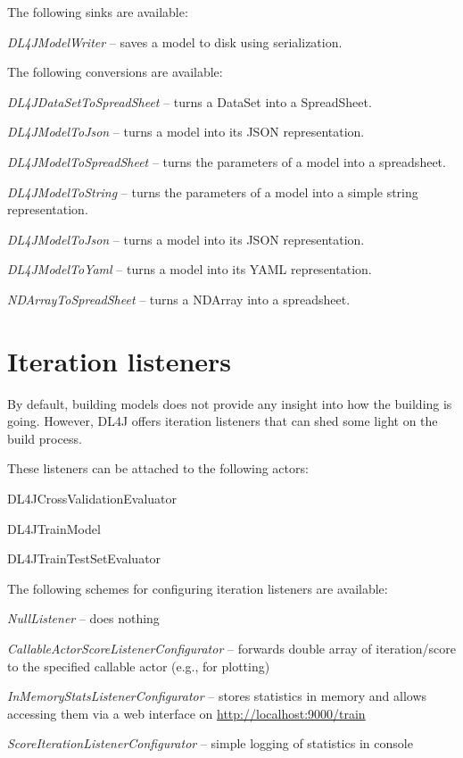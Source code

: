\documentclass[a4paper]{book}
\begin{document}
The following sinks are available:
\begin{tight_itemize}
  \item \textit{DL4JModelWriter} -- saves a model to disk using serialization.
\end{tight_itemize}

The following conversions are available:
\begin{tight_itemize}
  \item \textit{DL4JDataSetToSpreadSheet} -- turns a DataSet into a SpreadSheet.
  \item \textit{DL4JModelToJson} -- turns a model into its JSON\cite{json} representation.
  \item \textit{DL4JModelToSpreadSheet} -- turns the parameters of a model into a spreadsheet.
  \item \textit{DL4JModelToString} -- turns the parameters of a model into a simple string representation.
  \item \textit{DL4JModelToJson} -- turns a model into its JSON\cite{json} representation.
  \item \textit{DL4JModelToYaml} -- turns a model into its YAML\cite{yaml} representation.
  \item \textit{NDArrayToSpreadSheet} -- turns a NDArray into a spreadsheet.
\end{tight_itemize}

\section{Iteration listeners}
By default, building models does not provide any insight into how the building
is going. However, DL4J offers iteration listeners that can shed some light
on the build process.

These listeners can be attached to the following actors:
\begin{tight_itemize}
  \item DL4JCrossValidationEvaluator
  \item DL4JTrainModel
  \item DL4JTrainTestSetEvaluator
\end{tight_itemize}

The following schemes for configuring iteration listeners are available:
\begin{tight_itemize}
  \item \textit{NullListener} -- does nothing
  \item \textit{CallableActorScoreListenerConfigurator} -- forwards double array
  of iteration/score to the specified callable actor (e.g., for plotting)
  \item \textit{InMemoryStatsListenerConfigurator} -- stores statistics in memory
  and allows accessing them via a web interface on \url{http://localhost:9000/train}{}
  \item \textit{ScoreIterationListenerConfigurator} -- simple logging of
  statistics in console
\end{tight_itemize}
\end{document}
